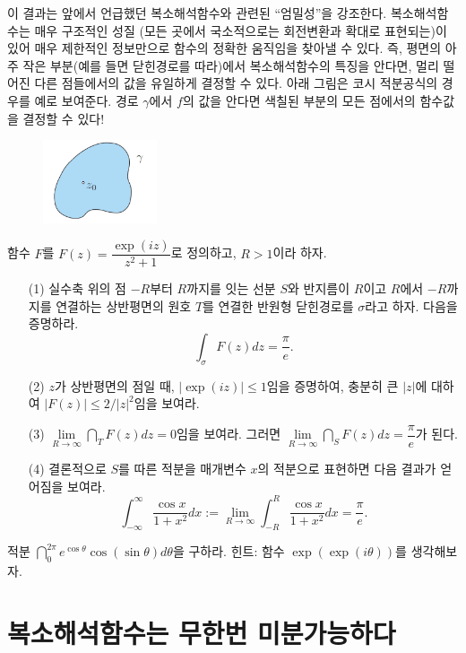 이 결과는 앞에서 언급했던  복소해석함수와 관련된 ``엄밀성''을 강조한다.
복소해석함수는 매우 구조적인 성질 (모든 곳에서 국소적으로는 회전변환과 확대로 표현되는)이 있어
매우 제한적인 정보만으로 함수의 정확한 움직임을 찾아낼 수 있다.
즉, 평면의 아주 작은 부분(예를 들면 닫힌경로를 따라)에서 복소해석함수의 특징을 안다면,
멀리 떨어진 다른 점들에서의 값을 유일하게 결정할 수 있다.
아래 그림은 코시 적분공식의 경우를 예로 보여준다.
경로 $\gamma$에서 $f$의 값을 안다면 색칠된 부분의 모든 점에서의 함수값을 결정할 수 있다!
\begin{figure}[h!]
\begin{center}
\includegraphics[width=0.3\textwidth]{./SaltChapter/fig-3-0-10}
\end{center}
\end{figure}

\begin{salt_exercise} \label{ex-3-27}
함수 $F$를 $F(z) = \dfrac{\exp(iz)}{z^2+1}$로 정의하고, $R>1$이라 하자.
\begin{itemize}
\item[(1)]
실수축 위의 점 $-R$부터 $R$까지를 잇는 선분 $S$와
반지름이 $R$이고 $R$에서 $-R$까지를 연결하는 상반평면의 원호 $T$를 연결한 
반원형 닫힌경로를 $\sigma$라고 하자.
다음을 증명하라.
\[
\int_\sigma F(z)dz = \dfrac\pi e.
\]
\item[(2)] $z$가 상반평면의 점일 때, $|\exp(iz)|\le 1$임을 증명하여,
충분히 큰 $|z|$에 대하여 $|F(z)| \le 2/|z|^2$임을 보여라.
\item[(3)] $\lim\limits_{R\to\infty} \dint_T F(z)dz = 0$임을 보여라.
그러면 $\lim\limits_{R\to\infty} \dint_S F(z)dz = \dfrac\pi e$가 된다.
\item[(4)] 결론적으로 $S$를 따른 적분을 매개변수 $x$의 적분으로 표현하면 다음 결과가 얻어짐을 보여라.
\[
\int_{-\infty}^\infty \dfrac{\cos x}{1+x^2}dx := 
\lim_{R\to\infty} \int_{-R}^R \dfrac{\cos x}{1+x^2} dx = \dfrac \pi e.
\]
\end{itemize}
\end{salt_exercise}

\begin{salt_exercise} \label{ex-3-28}
적분 $\dint_0^{2\pi} e^{\cos \theta} \cos(\sin\theta)d\theta$을 구하라.
힌트: 함수 $\exp(\exp(i\theta))$를 생각해보자.
\end{salt_exercise}

\section{복소해석함수는 무한번 미분가능하다}




















